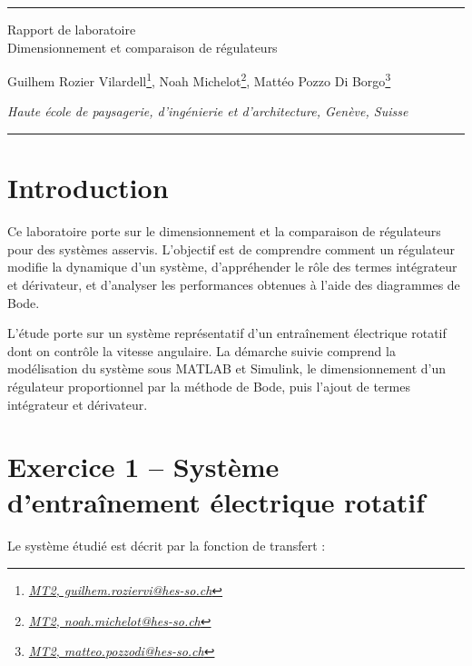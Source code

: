 \documentclass[a4paper,5pt]{article}
\begin{document}
\begin{center}
\rule{\linewidth}{0.4pt}
{\large
Rapport de laboratoire\\
\vspace{2mm}
Dimensionnement et comparaison de régulateurs
}

\vspace{8mm}

Guilhem Rozier Vilardell\footnote{\textit{\href{mailto:guilhem.roziervi@hes-so.ch}{MT2, guilhem.roziervi@hes-so.ch}}},
Noah Michelot\footnote{\textit{\href{mailto:noah.michelot@hes-so.ch}{MT2, noah.michelot@hes-so.ch}}},
Mattéo Pozzo Di Borgo\footnote{\textit{\href{mailto:matteo.pozzodi@hes-so.ch}{MT2, matteo.pozzodi@hes-so.ch}}}

\vspace{3mm}

\footnotesize{
\textit{Haute école de paysagerie, d'ingénierie et d'architecture, Genève, Suisse}
}
\rule{\linewidth}{0.4pt}
\vspace{9mm}

\end{center}

\setlength{\parskip}{10pt}


\section{Introduction}

Ce laboratoire porte sur le dimensionnement et 
la comparaison de régulateurs pour des systèmes 
asservis. L'objectif est de comprendre comment un 
régulateur modifie la dynamique d'un système, 
d'appréhender le rôle des termes intégrateur et 
dérivateur, et d'analyser les performances obtenues 
à l'aide des diagrammes de Bode.

L'étude porte sur un système représentatif d'un 
entraînement électrique rotatif dont on contrôle 
la vitesse angulaire. La démarche suivie comprend 
la modélisation du système sous MATLAB et Simulink, 
le dimensionnement d'un régulateur proportionnel par 
la méthode de Bode, puis l'ajout de termes intégrateur et 
dérivateur.

\section{Exercice 1 -- Système d'entraînement électrique rotatif}

Le système étudié est décrit par la fonction de transfert :
\end{document}
